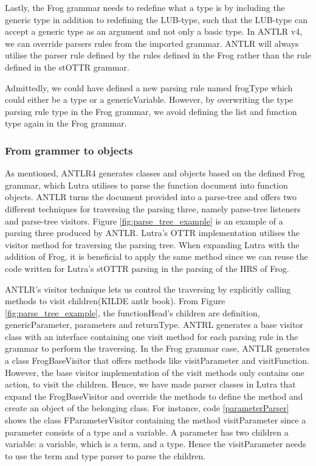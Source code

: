 \para


\para
Lastly, the Frog grammar needs to redefine what a type is by including the generic type in addition to redefining the LUB-type, such that the LUB-type can accept a generic type as an argument and not only a basic type. In ANTLR v4, we can override parsers rules from the imported grammar. ANTLR will always utilise the parser rule defined by the rules defined in the Frog rather than the rule defined in the stOTTR grammar.

\para


\para 
Admittedly, we could have defined a new parsing rule named frogType which could either be a type or a genericVariable. However, by overwriting the type parsing rule type in the Frog grammar, we avoid defining the list and function type again in the Frog grammar.

\subsubsection{From grammer to objects}
As mentioned, ANTLR4 generates classes and objects based on the defined Frog grammar, which Lutra utilises to parse the function document into function objects. ANTLR turns the document provided into a parse-tree and offers two different techniques for traversing the parsing three, namely parse-tree listeners and parse-tree visitors. Figure \ref{fig:parse_tree_example} is an example of a parsing three produced by ANTLR. Lutra's OTTR implementation utilises the visitor method for traversing the parsing tree. When expanding Lutra with the addition of Frog, it is beneficial to apply the same method since we can reuse the code written for Lutra's stOTTR parsing in the parsing of the HRS of Frog. 

\para
ANTLR's visitor technique lets us control the traversing by explicitly calling methods to visit children(KILDE antlr book). From Figure \ref{fig:parse_tree_example}, the functionHead's children are definition, genericParameter, parameters and returnType. ANTRL generates a base visitor class with an interface containing one visit method for each parsing rule in the grammar to perform the traversing. In the Frog grammar case, ANTLR generates a class FrogBaseVisitor that offers methods like visitParameter and visitFunction. However, the base visitor implementation of the visit methods only contains one action, to visit the children. Hence, we have made parser classes in Lutra that expand the FrogBaseVisitor and override the methods to define the method and create an object of the belonging class. For instance, code \ref{parameterParser} shows the class FParameterVisitor containing the method visitParameter since a parameter consists of a type and a variable. A parameter has two children a variable: a variable, which is a term, and a type. Hence the visitParameter needs to use the term and type parser to parse the children.

